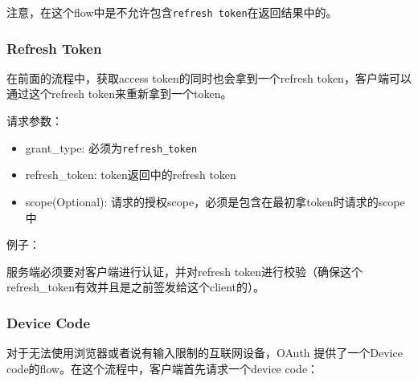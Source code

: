 \documentclass[12pt]{article}
\begin{document}
注意，在这个flow中是不允许包含\texttt{refresh\ token}在返回结果中的。

\subsubsection{Refresh Token}\label{refresh-token}

在前面的流程中，获取access token的同时也会拿到一个refresh token，客户端可以通过这个refresh token来重新拿到一个token。

请求参数：

\begin{itemize}
\tightlist
\item
  grant\_type: 必须为\texttt{refresh\_token}
\item
  refresh\_token: token返回中的refresh token
\item
  scope(Optional): 请求的授权scope，必须是包含在最初拿token时请求的scope中
\end{itemize}

例子：

\begin{Shaded}
\begin{Highlighting}[]
 \OperatorTok{/} \OperatorTok{/}
     \OperatorTok{:} 
     \OperatorTok{:}  
     \OperatorTok{{-}}\OperatorTok{:} \OperatorTok{/}\OperatorTok{{-}}\OperatorTok{{-}}\OperatorTok{{-}}

     \OperatorTok{=}\OperatorTok{\&}\OperatorTok{=}
\end{Highlighting}
\end{Shaded}

服务端必须要对客户端进行认证，并对refresh token进行校验（确保这个refresh\_token有效并且是之前签发给这个client的）。

\subsubsection{Device Code}\label{device-code}

对于无法使用浏览器或者说有输入限制的互联网设备，OAuth 提供了一个Device code的flow。在这个流程中，客户端首先请求一个device code：
\end{document}
